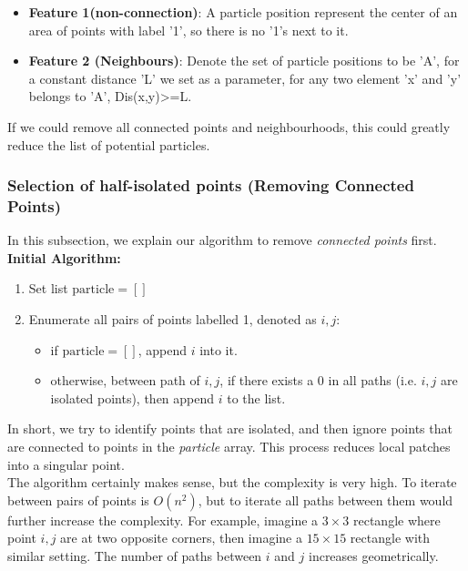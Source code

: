 \documentclass[11pt,a4paper]{scrartcl}
\begin{document}
\begin{itemize}
    \item \textbf{Feature 1(non-connection)}: A particle position represent the center of an area of points with label '1', so there is no '1's next to it.
    \item \textbf{Feature 2 (Neighbours)}: Denote the set of particle positions to be 'A', for a constant distance 'L' we set as a parameter, for any two element 'x' and 'y' belongs to 'A', Dis(x,y)>=L.
\end{itemize} %

If we could remove all connected points and neighbourhoods, this could greatly reduce the list of potential particles.

\subsubsection{Selection of half-isolated points (Removing Connected Points)}
In this subsection, we explain our algorithm to remove \textit{connected points} first.\\

\textbf{Initial Algorithm:}
\begin{enumerate}
    \item Set list $\text{particle} = []$
    \item Enumerate all pairs of points labelled 1, denoted as $i, j$:
    \begin{itemize}
        \item if $\text{particle} = []$, append $i$ into it. 
        \item otherwise, between path of $i, j$, if there exists a 0 in all paths (i.e. $i, j$ are isolated points), then append $i$ to the list.
    \end{itemize}
\end{enumerate}

In short, we try to identify points that are isolated, and then ignore points that are connected to points in the \textit{particle} array. This process reduces local patches into a singular point.\\

The algorithm certainly makes sense, but the complexity is very high. To iterate between pairs of points is $O(n^2)$, but to iterate all paths between them would further increase the complexity. For example, imagine a $3\times 3$ rectangle where point $i, j$ are at two opposite corners, then imagine a $15\times 15$ rectangle with similar setting. The number of paths between $i$ and $j$ increases geometrically. \\
\end{document}
